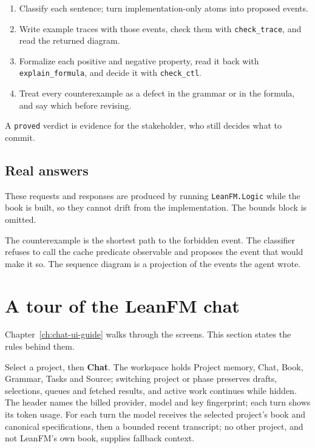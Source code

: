 \begin{enumerate}
\item Classify each sentence; turn implementation-only atoms into proposed events.
\item Write example traces with those events, check them with
\texttt{check\_trace}, and read the returned diagram.
\item Formalize each positive and negative property, read it back with
\texttt{explain\_formula}, and decide it with \texttt{check\_ctl}.
\item Treat every counterexample as a defect in the grammar or in the formula,
and say which before revising.
\end{enumerate}

A \texttt{proved} verdict is evidence for the stakeholder, who still decides what
to commit.

\subsection{Real answers}

These requests and responses are produced by running \texttt{LeanFM.Logic} while
the book is built, so they cannot drift from the implementation. The bounds block
is omitted.



The counterexample is the shortest path to the forbidden event. The classifier
refuses to call the cache predicate observable and proposes the event that would
make it so. The sequence diagram is a projection of the events the agent wrote.

\section{A tour of the LeanFM chat}

Chapter~\ref{ch:chat-ui-guide} walks through the screens. This section states
the rules behind them.

Select a project, then \textbf{Chat}. The workspace holds Project memory, Chat,
Book, Grammar, Tasks and Source; switching project or phase preserves drafts,
selections, queues and fetched results, and active work continues while hidden.
The header names the billed provider, model and key fingerprint; each turn shows
its token usage. For each turn the model receives the selected project's book
and canonical specifications, then a bounded recent transcript; no other project,
and not LeanFM's own book, supplies fallback context.

